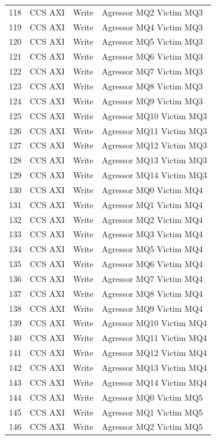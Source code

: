 \begin{center}
\begin{longtable}{|l|l|l|l|}
118 & CCS AXI & Write &  Agressor MQ2 Victim MQ3\\
119 & CCS AXI & Write &  Agressor MQ4 Victim MQ3\\
120 & CCS AXI & Write &  Agressor MQ5 Victim MQ3\\
121 & CCS AXI & Write &  Agressor MQ6 Victim MQ3\\
122 & CCS AXI & Write &  Agressor MQ7 Victim MQ3\\
123 & CCS AXI & Write &  Agressor MQ8 Victim MQ3\\
124 & CCS AXI & Write &  Agressor MQ9 Victim MQ3\\
125 & CCS AXI & Write &  Agressor MQ10 Victim MQ3\\
126 & CCS AXI & Write &  Agressor MQ11 Victim MQ3\\
127 & CCS AXI & Write &  Agressor MQ12 Victim MQ3\\
128 & CCS AXI & Write &  Agressor MQ13 Victim MQ3\\
129 & CCS AXI & Write &  Agressor MQ14 Victim MQ3\\
130 & CCS AXI & Write &  Agressor MQ0 Victim MQ4\\
131 & CCS AXI & Write &  Agressor MQ1 Victim MQ4\\
132 & CCS AXI & Write &  Agressor MQ2 Victim MQ4\\
133 & CCS AXI & Write &  Agressor MQ3 Victim MQ4\\
134 & CCS AXI & Write &  Agressor MQ5 Victim MQ4\\
135 & CCS AXI & Write &  Agressor MQ6 Victim MQ4\\
136 & CCS AXI & Write &  Agressor MQ7 Victim MQ4\\
137 & CCS AXI & Write &  Agressor MQ8 Victim MQ4\\
138 & CCS AXI & Write &  Agressor MQ9 Victim MQ4\\
139 & CCS AXI & Write &  Agressor MQ10 Victim MQ4\\
140 & CCS AXI & Write &  Agressor MQ11 Victim MQ4\\
141 & CCS AXI & Write &  Agressor MQ12 Victim MQ4\\
142 & CCS AXI & Write &  Agressor MQ13 Victim MQ4\\
143 & CCS AXI & Write &  Agressor MQ14 Victim MQ4\\
144 & CCS AXI & Write &  Agressor MQ0 Victim MQ5\\
145 & CCS AXI & Write &  Agressor MQ1 Victim MQ5\\
146 & CCS AXI & Write &  Agressor MQ2 Victim MQ5\\

\end{longtable}
\end{center}
